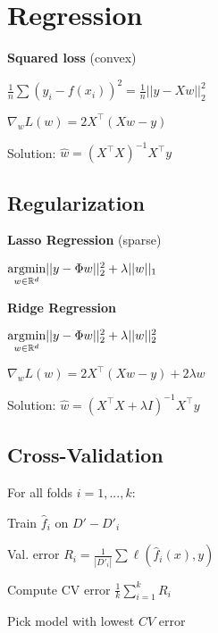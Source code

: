 \section*{Regression}

\textbf{Squared loss} \quad (convex)

\qquad \qquad $\frac{1}{n}\sum (y_i - f(x_i))^2 = \frac{1}{n}||y - X w||_2^2$

\qquad \qquad $\nabla_w L(w) = 2X^\top(Xw -y)$

Solution: $\hat{w} = (X^\top X)^{-1}X^\top y$

\subsection*{Regularization}

\textbf{Lasso Regression} \quad (sparse)

\qquad \qquad $\underset{w \in \mathbb{R}^d}{\text{argmin}} ||y - \Phi w||_2^2 + \lambda ||w||_1$

\textbf{Ridge Regression}

\qquad \qquad $\underset{w \in \mathbb{R}^d}{\text{argmin}} ||y - \Phi w||_2^2 + \lambda ||w||_2^2$

\qquad \qquad $\nabla_w L(w) = 2X^\top(Xw -y) + 2 \lambda w$

Solution: $\hat w = (X^\top X + \lambda I)^{-1} X^\top y$

\subsection*{Cross-Validation}

\begin{compactitem}
	\item For all folds $i = 1,..., k$: 
		\begin{compactitem}
			\item Train $\hat{f}_i$ on $D' - D'_i$
			\item Val. error $R_i = \frac{1}{|D'_i|} \sum \ell(\hat{f}_i(x), y)$
		\end{compactitem}
	\item Compute CV error $\frac{1}{k} \sum_{i=1}^k R_i$
	\item Pick model with lowest $CV$ error
\end{compactitem}